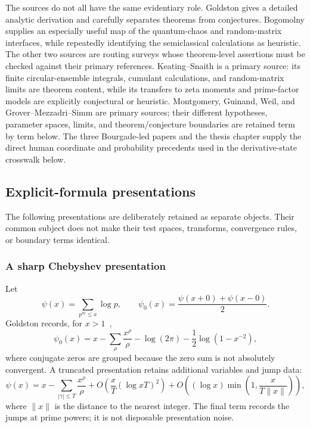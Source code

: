 The sources do not all have the same evidentiary role.  Goldston gives a detailed analytic
derivation and carefully separates theorems from conjectures.  Bogomolny supplies an
especially useful map of the quantum-chaos and random-matrix interfaces, while repeatedly
identifying the semiclassical calculations as heuristic.  The other two sources are routing
surveys whose theorem-level assertions must be checked against their primary references.
Keating--Snaith is a primary source: its finite circular-ensemble integrals, cumulant
calculations, and random-matrix limits are theorem content, while its transfers to zeta
moments and prime-factor models are explicitly conjectural or heuristic.  Montgomery,
Guinand, Weil, and Grover--Mezzadri--Simm are primary sources; their different hypotheses,
parameter spaces, limits, and theorem/conjecture boundaries are retained term by term below.
The three Bourgade-led papers and the thesis chapter supply the direct human coordinate and
probability precedents used in the derivative-state crosswalk below.

\subsection{Explicit-formula presentations}

The following presentations are deliberately retained as separate objects.  Their common subject
does not make their test spaces, transforms, convergence rules, or boundary terms identical.

\subsubsection{A sharp Chebyshev presentation}

Let
\[
  \psi(x)=\sum_{p^m\leq x}\log p,
  \qquad
  \psi_0(x)=\frac{\psi(x+0)+\psi(x-0)}2.
\]
Goldston records, for $x>1$~\cite[eqs.~(3.1), (3.3), and~(3.4)]{goldston2004},
\begin{equation}
 \psi_0(x)=x-\sum_\rho\frac{x^\rho}{\rho}
 -\log(2\pi)-\frac12\log(1-x^{-2}),
 \label{eq:sharp-explicit}
\end{equation}
where conjugate zeros are grouped because the zero sum is not absolutely convergent.  A
truncated presentation retains additional variables and jump data:
\begin{equation}
 \psi(x)=x-\sum_{|\gamma|\leq T}\frac{x^\rho}{\rho}
 +O\!\left(\frac{x}{T}(\log xT)^2\right)
 +O\!\left((\log x)\min\!\left(1,\frac{x}{T\lVert x\rVert}\right)\right),
 \label{eq:truncated-explicit}
\end{equation}
where $\lVert x\rVert$ is the distance to the nearest integer.  The final term records the
jumps at prime powers; it is not disposable presentation noise.

